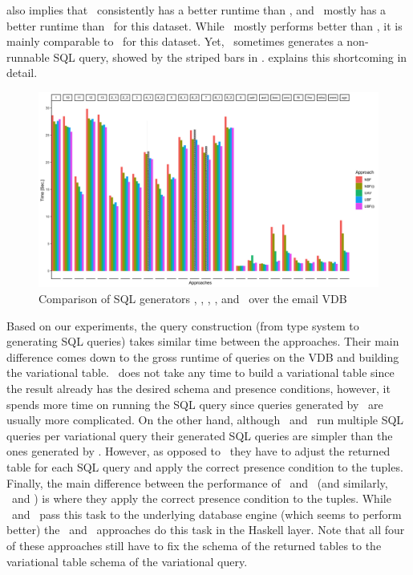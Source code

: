 %
 also implies that \nbfi\ consistently has a better
runtime than \nbf, and \ubfi\ mostly has a better runtime than \ubf\ for this dataset. While
\uav\ mostly performs better than \nbfi, it is mainly comparable to \ubfi\ for this dataset. Yet, \uav\
sometimes generates a non-runnable SQL query, showed by the striped bars in .
\exref{uav-fail} explains this shortcoming in detail. 


\begin{figure}[!t]
\centering
\includegraphics[width = \linewidth] {figs/plots/enron1-5.png}
\caption[Comparison of SQL generators \nbf, \nbfi, \uav, \ubf, and \ubfi\ over the email VDB]{Comparison of SQL generators \nbf, \nbfi, \uav, \ubf, and \ubfi\ over the email VDB}
\label{fig:enron1-5}
\end{figure}


%
Based on our experiments, the query construction (from type system to generating SQL queries) takes
similar time between the approaches. Their main difference comes down to the gross runtime
of queries on the VDB and building the variational table. 
%
\uav\ does not take any time to build a variational table since the result already has the
desired schema and presence conditions, however, it spends more time on running the 
SQL query since queries generated by \uav\ are usually more complicated. 
%
On the other hand, although \nbf\ and \ubf\ run multiple SQL queries per variational query
their generated SQL queries are simpler than the ones generated by \uav. However,
as opposed to \uav\ they have to adjust the returned table for each SQL query and apply
the correct presence condition to the tuples. 
%
Finally, the main difference between the performance of  \nbf\ and \nbfi\ (and similarly, \ubf\ and \ubfi)
is where they apply the correct presence condition to the tuples. While \nbfi\ and \ubfi\ pass this
task to the underlying database engine (which seems to perform better) the \nbf\ and \ubf\ approaches 
do this task in the Haskell layer.
Note that all four of these approaches still have to fix the schema of the returned
tables to the variational table schema of the variational query. 

